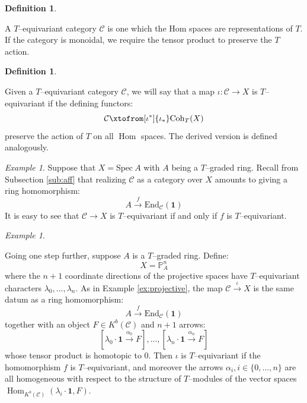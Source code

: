 \documentclass[12pt]{amsart}
\numberwithin{equation}{section}
\theoremstyle{definition}
\newtheorem{definition}[theorem]{Definition}
\theoremstyle{remark}
\newtheorem{example}[theorem]{Example}
\DeclareMathOperator{\Hom}{Hom}
\newcommand{\PP}{\mathbb{P}}
\newcommand{\cat}{\mathcal{C}}
\renewcommand{\1}{\mathbf{1}}
\newcommand{\coh}{\mathrm{Coh}}
\newcommand{\End}{\mathrm{End}}
\newcommand{\spec}{\mathrm{Spec}}
\begin{document}
\begin{definition}
\label{def:equivariantcategory} 

A $T$--equivariant category $\cat$ is one which the Hom spaces are representations of $T$. If the category is monoidal, we require the tensor product to preserve the $T$ action. 

\end{definition}

\begin{definition}
\label{def:equivariant} 

Given a $T$--equivariant category $\cat$, we will say that a map $\iota:\cat \rightarrow X$ is $T$--equivariant if the defining functors:
$$
\cat \xtofrom[\iota^*]{\iota_*} \coh_T(X)
$$
preserve the action of $T$ on all $\Hom$ spaces. The derived version is defined analogously. 
\end{definition}

\begin{example}
\label{ex:equivspec} 
Suppose that $X = \spec \ A$ with $A$ being a $T$--graded ring. Recall from Subsection \ref{sub:aff} that realizing $\cat$ as a category over $X$ amounts to giving a ring homomorphism:
$$
A \stackrel{f}\longrightarrow \End_\cat(\1)
$$ 
It is easy to see that $\cat \rightarrow X$ is $T$--equivariant if and only if $f$ is $T$--equivariant.
\end{example}

\begin{example}
\label{ex:equivproj} 

Going one step further, suppose $A$ is a $T$--graded ring. Define:
$$
X = \PP_A^n
$$ 
where the $n+1$ coordinate directions of the projective spaces have $T$--equivariant characters $\lambda_0,...,\lambda_n$. As in Example \ref{ex:projective}, the map $\cat \stackrel{\iota}\longrightarrow X$ is the same datum as a ring homomorphism:
$$
A \stackrel{f}\longrightarrow \End_\cat(\1)
$$
together with an object $F \in K^b(\cat)$ and $n+1$ arrows:
$$
\left[ \lambda_0 \cdot \1 \stackrel{\alpha_0}\longrightarrow F \right], ..., \left[ \lambda_n \cdot \1 \stackrel{\alpha_n}\longrightarrow F \right]
$$
whose tensor product is homotopic to 0. Then $\iota$ is $T$--equivariant if the homomorphism $f$ is $T$--equivariant, and moreover the arrows $\alpha_i, i\in \{0,...,n\}$ are all homogeneous with respect to the structure of $T$--modules of the vector spaces $\Hom_{K^b(\cat)}(\lambda_i \cdot \1, F)$. 

\end{example}
\end{document}
